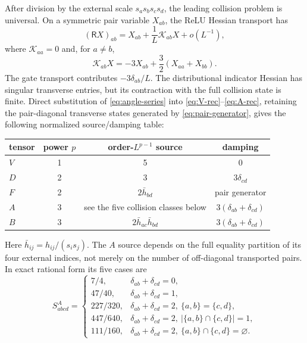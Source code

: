 \documentclass{article}
\begin{document}
After division by the external scale \(s_as_bs_cs_d\), the leading collision
problem is universal.  On a symmetric pair variable \(X_{ab}\), the ReLU
Hessian transport has
\begin{equation}
(\mathsf RX)_{ab}
=X_{ab}+\frac1L\mathcal K_{ab}X+o(L^{-1}),
\end{equation}
where \(\mathcal K_{aa}=0\) and, for \(a\ne b\),
\begin{equation}
\mathcal K_{ab}X=-3X_{ab}+\frac32(X_{aa}+X_{bb}).
\label{eq:pair-generator}
\end{equation}
The gate transport contributes \(-3\delta_{ab}/L\).  The distributional
indicator Hessian has singular transverse entries, but its contraction with
the full collision state is finite.  Direct substitution of
\eqref{eq:angle-series} into \eqref{eq:V-rec}--\eqref{eq:A-rec}, retaining the
pair-diagonal transverse states generated by \eqref{eq:pair-generator}, gives
the following normalized source/damping table:
\begin{center}
\begin{tabular}{lccc}
\toprule
tensor&power \(p\)&order-\(L^{p-1}\) source&damping\\
\midrule
\(V\)&1&5&0\\
\(D\)&2&3&\(3\delta_{cd}\)\\
\(F\)&2&\(2\bar h_{bd}\)&pair generator\\
\(A\)&3&see the five collision classes below&\(3(\delta_{ab}+\delta_{cd})\)\\
\(B\)&3&\(2\bar h_{ac}\bar h_{bd}\)&\(3(\delta_{ab}+\delta_{cd})\)\\
\bottomrule
\end{tabular}
\end{center}
\begin{samepage}
Here \(\bar h_{ij}=h_{ij}/(s_is_j)\).  The \(A\) source depends on the full
equality partition of its four external indices, not merely on the number of
off-diagonal transported pairs.  In exact rational form its five cases are
\begin{equation}
S^A_{abcd}=\begin{cases}
7/4,&\delta_{ab}+\delta_{cd}=0,\\
47/40,&\delta_{ab}+\delta_{cd}=1,\\
227/320,&\delta_{ab}+\delta_{cd}=2,
\ \{a,b\}=\{c,d\},\\
447/640,&\delta_{ab}+\delta_{cd}=2,
\ |\{a,b\}\cap\{c,d\}|=1,\\
111/160,&\delta_{ab}+\delta_{cd}=2,
\ \{a,b\}\cap\{c,d\}=\varnothing.
\end{cases}
\label{eq:A-source-collisions}
\end{equation}
\end{samepage}
\end{document}
